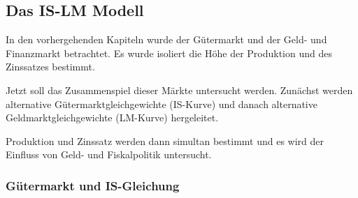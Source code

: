 \documentclass[11pt]{article}
\begin{document}
\subsection{Das IS-LM Modell}
\label{sec:orgf0d8a91}
In den vorhergehenden Kapiteln wurde der Gütermarkt und der Geld- und Finanzmarkt betrachtet. Es wurde isoliert die Höhe der Produktion und des Zinssatzes bestimmt.

Jetzt soll das Zusammenspiel dieser Märkte untersucht werden. Zunächst werden alternative Gütermarktgleichgewichte (IS-Kurve) und danach alternative Geldmarktgleichgewichte (LM-Kurve) hergeleitet.

Produktion und Zinssatz werden dann simultan bestimmt und es wird der Einfluss von Geld- und Fiskalpolitik untersucht.

\subsubsection{Gütermarkt und IS-Gleichung}
\label{sec:org2a7f663}
\end{document}
